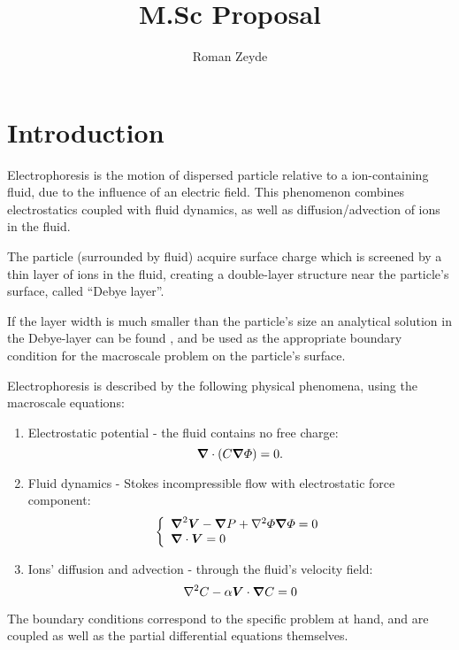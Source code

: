 \documentclass[11pt]{article}
\title{M.Sc Proposal}
\author{Roman Zeyde}
\begin{document}
\maketitle
\section{Introduction}
Electrophoresis is the motion of dispersed particle relative to a ion-containing fluid,
due to the influence of an electric field. This phenomenon combines electrostatics 
coupled with fluid dynamics, as well as diffusion/advection of ions in the fluid.

The particle (surrounded by fluid) acquire surface charge which is screened by 
a thin layer of ions in the fluid, creating a double-layer structure near the 
particle's surface, called ``Debye layer''.

If the layer width is much smaller than the particle's size
an analytical solution in the Debye-layer can be found \cite{Yariv10}, 
and be used as the appropriate boundary condition for the 
macroscale problem on the particle's surface.

Electrophoresis is described by the following physical phenomena,
using the macroscale equations:
\begin{enumerate}
\item Electrostatic potential - the fluid contains no free charge:
\begin{equation}
    \boldsymbol{\nabla} \cdot (C \boldsymbol{\nabla} \varPhi) = 0.
\end{equation}
\item Fluid dynamics - Stokes incompressible flow with electrostatic force component:
\begin{equation}
\left\{ \begin{array}{l}
\boldsymbol{\nabla}^2 \boldsymbol{V} - \boldsymbol{\nabla} P + \nabla^2 \varPhi \boldsymbol{\nabla} \varPhi = 0 \\
\boldsymbol{\nabla} \cdot \boldsymbol{V} = 0 \end{array} \right.
\end{equation}
\item Ions' diffusion and advection - through the fluid's velocity field:
\begin{equation}
\nabla^2 C - \alpha \boldsymbol{V} \cdot \boldsymbol{\nabla} C = 0
\end{equation}
\end{enumerate}

The boundary conditions correspond to the specific problem at hand, and
are coupled as well as the partial differential equations themselves.
\end{document}
